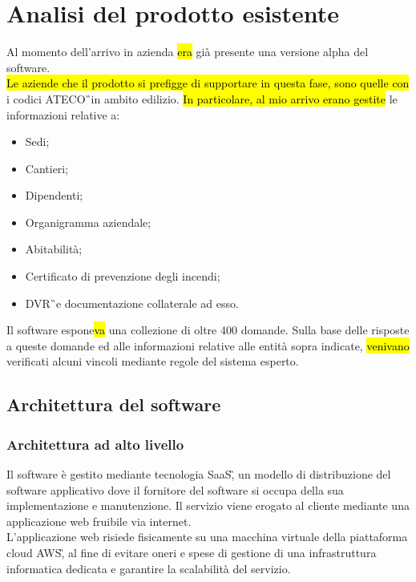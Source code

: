 \section{Analisi del prodotto esistente}

Al momento dell'arrivo in azienda \hl{era} già presente una versione alpha del software. \\
\hl{Le aziende che il prodotto si prefigge di supportare in questa fase, sono quelle con} i codici \gls{ATECO}\G\ in ambito edilizio. \hl{In particolare, al mio arrivo erano gestite} le informazioni relative a:
\begin{itemize}
	\item Sedi;
	\item Cantieri;
	\item Dipendenti;
	\item Organigramma aziendale;
	\item Abitabilità;
	\item Certificato di prevenzione degli incendi;
	\item \gls{DVR}\G\ e documentazione collaterale ad esso.
\end{itemize}
Il software espone\hl{va} una collezione di oltre 400 domande. Sulla base delle risposte a queste domande ed alle informazioni relative alle entità sopra indicate, \hl{venivano} verificati alcuni vincoli mediante regole del sistema esperto.

\subsection{Architettura del software}
\subsubsection{Architettura ad alto livello}
Il software è gestito mediante tecnologia \gls{SaaS}\G, un modello di distribuzione del software applicativo dove il fornitore del software si occupa della sua implementazione e manutenzione. Il servizio viene erogato al cliente mediante una applicazione web fruibile via internet. \\ 
L'applicazione web risiede fisicamente su una macchina virtuale della piattaforma cloud \gls{AWS}\G, al fine di evitare oneri e spese di gestione di una infrastruttura informatica dedicata e garantire la scalabilità del servizio.\\

